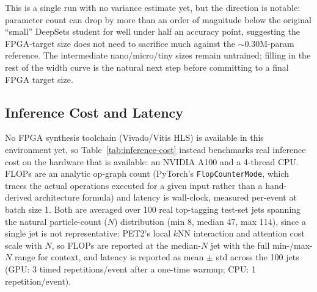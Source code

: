 This is a single run with no variance estimate yet, but the direction is
notable: parameter count can drop by more than an order of magnitude below
the original ``small'' DeepSets student for well under half an accuracy
point, suggesting the FPGA-target size does not need to sacrifice much
against the $\sim$0.30M-param reference. The intermediate nano/micro/tiny
sizes remain untrained; filling in the rest of the width curve is the
natural next step before committing to a final FPGA target size.

\subsection{Inference Cost and Latency}
\label{sec:inference-cost}

No FPGA synthesis toolchain (Vivado/Vitis HLS) is available in this
environment yet, so Table~\ref{tab:inference-cost} instead benchmarks real
inference cost on the hardware that is available: an NVIDIA A100 and a
4-thread CPU. FLOPs are an analytic op-graph count (PyTorch's
\texttt{FlopCounterMode}, which traces the actual operations executed for a
given input rather than a hand-derived architecture formula) and latency is
wall-clock, measured per-event at batch size 1. Both are averaged over 100
real top-tagging test-set jets spanning the natural particle-count ($N$)
distribution (min 8, median 47, max 114), since a single jet is not
representative: PET2's local $k$NN interaction and attention cost scale with
$N$, so FLOPs are reported at the median-$N$ jet with the full min-/max-$N$
range for context, and latency is reported as mean $\pm$ std across the 100
jets (GPU: 3 timed repetitions/event after a one-time warmup; CPU: 1
repetition/event).

